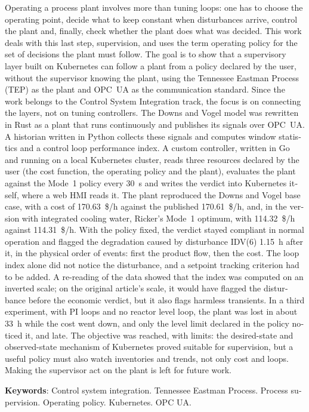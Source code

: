 
\begin{resumo}[ABSTRACT]
\begin{otherlanguage}{english}
\vspace*{-6mm}

Operating a process plant involves more than tuning loops: one has to choose the operating point, decide what to keep constant when disturbances arrive, control the plant and, finally, check whether the plant does what was decided. This work deals with this last step, supervision, and uses the term operating policy for the set of decisions the plant must follow. The goal is to show that a supervisory layer built on Kubernetes can follow a plant from a policy declared by the user, without the supervisor knowing the plant, using the Tennessee Eastman Process (TEP) as the plant and OPC~UA as the communication standard. Since the work belongs to the Control System Integration track, the focus is on connecting the layers, not on tuning controllers. The Downs and Vogel model was rewritten in Rust as a plant that runs continuously and publishes its signals over OPC~UA. A historian written in Python collects these signals and computes window statistics and a control loop performance index. A custom controller, written in Go and running on a local Kubernetes cluster, reads three resources declared by the user (the cost function, the operating policy and the plant), evaluates the plant against the Mode~1 policy every 30~s and writes the verdict into Kubernetes itself, where a web HMI reads it. The plant reproduced the Downs and Vogel base case, with a cost of 170.63~\$/h against the published 170.61~\$/h, and, in the version with integrated cooling water, Ricker's Mode~1 optimum, with 114.32~\$/h against 114.31~\$/h. With the policy fixed, the verdict stayed compliant in normal operation and flagged the degradation caused by disturbance IDV(6) 1.15~h after it, in the physical order of events: first the product flow, then the cost. The loop index alone did not notice the disturbance, and a setpoint tracking criterion had to be added. A re-reading of the data showed that the index was computed on an inverted scale; on the original article's scale, it would have flagged the disturbance before the economic verdict, but it also flags harmless transients. In a third experiment, with PI loops and no reactor level loop, the plant was lost in about 33~h while the cost went down, and only the level limit declared in the policy noticed it, and late. The objective was reached, with limits: the desired-state and observed-state mechanism of Kubernetes proved suitable for supervision, but a useful policy must also watch inventories and trends, not only cost and loops. Making the supervisor act on the plant is left for future work.

\textbf{Keywords}: Control system integration. Tennessee Eastman Process. Process supervision. Operating policy. Kubernetes. OPC UA.
  \end{otherlanguage}
\end{resumo}
